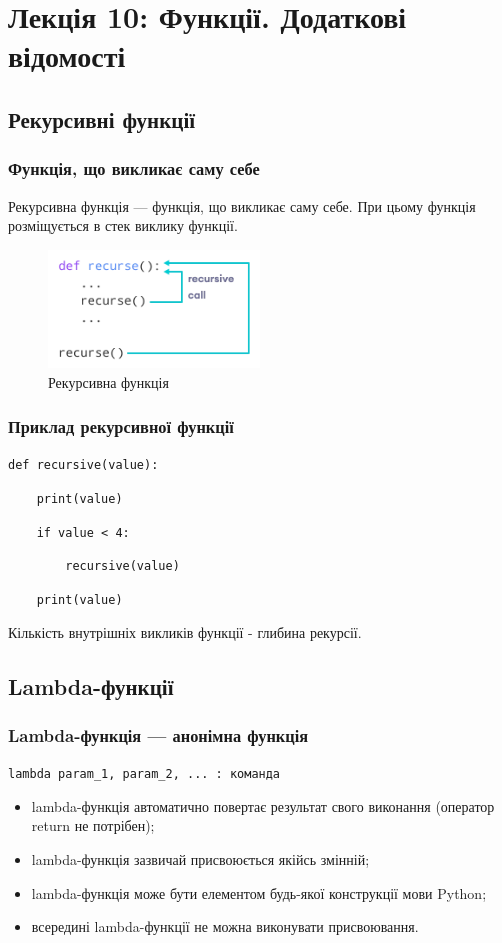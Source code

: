 \section*{Лекція 10: Функції. Додаткові відомості}
 
 \subsection{Рекурсивні функції} 
\begin{frame}
\frametitle{Функція, що викликає саму себе}
Рекурсивна функція — функція, що викликає саму себе. При цьому функція розміщується в стек виклику функції. 
\begin{figure}
  \begin{center}
    \includegraphics[width=0.5\textwidth,height=0.5\textheight]{pictures/recursion.png}
  \caption{Рекурсивна функція}
\label{function}
  \end{center}
\end{figure}
\end{frame}

\begin{frame}
\frametitle{Приклад рекурсивної функції}
\texttt{def recursive(value):}

\texttt{~~~~print(value)}

\texttt{~~~~if value < 4:}

\texttt{~~~~~~~~recursive(value)}

\texttt{~~~~print(value)}

\vspace{1cm}

Кількість внутрішніх викликів функції - глибина рекурсії.
\end{frame}

\subsection{Lambda-функції} 
\begin{frame}
\frametitle{Lambda-функція — анонімна функція}

\Large{\texttt{lambda param\_1, param\_2, ... : команда}}

\normalsize
\begin{itemize}
  \item lambda-функція автоматично повертає результат свого виконання (оператор return не потрібен);
  \item lambda-функція зазвичай присвоюється якійсь змінній; 
  \item lambda-функція може бути елементом будь-якої конструкції мови Python;
  \item всередині lambda-функції не можна виконувати присвоювання.
\end{itemize}

\end{frame}

